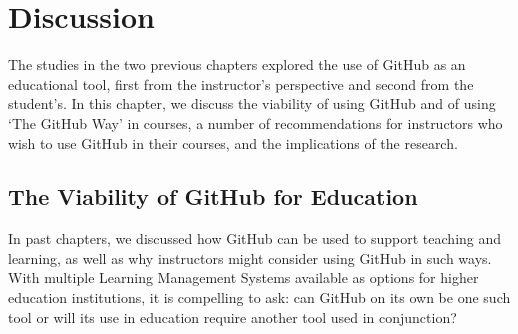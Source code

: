 \chapter{Discussion}
The studies in the two previous chapters explored the use of GitHub as an educational tool, first from the instructor's perspective and second from the student's. In this chapter, we discuss the viability of using GitHub and of using `The GitHub Way' in courses, a number of recommendations for instructors who wish to use GitHub in their courses, and the implications of the research.

\section{The Viability of GitHub for Education}
In past chapters, we discussed how GitHub can be used to support teaching and learning, as well as why instructors might consider using GitHub in such ways. With multiple Learning Management Systems available as options for higher education institutions, it is compelling to ask: can GitHub on its own be one such tool or will its use in education require another tool used in conjunction?


